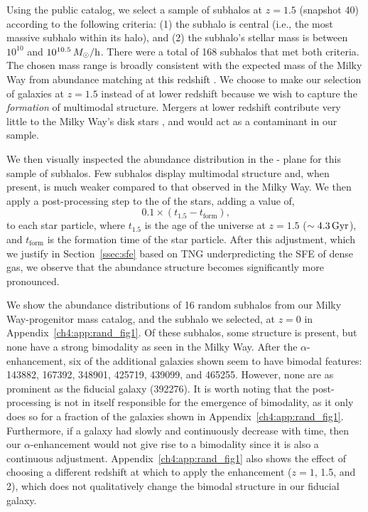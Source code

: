 Using the public catalog, we select a sample of subhalos at $z=1.5$ (snapshot 40) according to the following criteria: (1) the subhalo is central (i.e., the most massive subhalo within its halo), and (2) the subhalo's stellar mass is between $10^{10}$ and $10^{10.5}\,M_{\odot}/\textrm{h}$. There were a total of 168 subhalos that met both criteria. The chosen mass range is broadly consistent with the expected mass of the Milky Way from abundance matching at this redshift \citep{2013ApJ...771L..35V}. We choose to make our selection of galaxies at $z=1.5$ instead of at lower redshift because we wish to capture the \textit{formation} of multimodal structure. Mergers at lower redshift contribute very little to the Milky Way's disk stars \citep[e.g.,][]{2016ARA&A..54..529B}, and would act as a contaminant in our sample.

We then visually inspected the abundance distribution in the \MgFe{}-\FeH{} plane for this sample of subhalos. Few subhalos display multimodal structure and, when present, is much weaker compared to that observed in the Milky Way. We then apply a post-processing step to the \MgFe{} of the stars, adding a value of,
\begin{equation*}
  0.1\times\left(t_{1.5}-t_{\textrm{form}}\right)\textrm{,}
\end{equation*}
to each star particle, where $t_{1.5}$ is the age of the universe at $z=1.5$ ($\sim4.3\,\textrm{Gyr}$), and $t_{\textrm{form}}$ is the formation time of the star particle. After this adjustment, which we justify in Section~\ref{ssec:sfe} based on TNG underpredicting the SFE of dense gas, we observe that the abundance structure becomes significantly more pronounced.

We show the abundance distributions of 16 random subhalos from our Milky Way-progenitor mass catalog, and the subhalo we selected, at $z=0$ in Appendix~\ref{ch4:app:rand_fig1}. Of these subhalos, some structure is present, but none have a strong bimodality as seen in the Milky Way. After the $\alpha$-enhancement, six of the additional galaxies shown seem to have bimodal features: 143882, 167392, 348901, 425719, 439099, and 465255. However, none are as prominent as the fiducial galaxy (392276). It is worth noting that the post-processing is not in itself responsible for the emergence of bimodality, as it only does so for a fraction of the galaxies shown in Appendix~\ref{ch4:app:rand_fig1}. Furthermore, if a galaxy had \alphaFe{} slowly and continuously decrease with time, then our $\alpha$-enhancement would not give rise to a bimodality since it is also a continuous adjustment. Appendix~\ref{ch4:app:rand_fig1} also shows the effect of choosing a different redshift at which to apply the enhancement ($z=1$, 1.5, and 2), which does not qualitatively change the bimodal structure in our fiducial galaxy.

